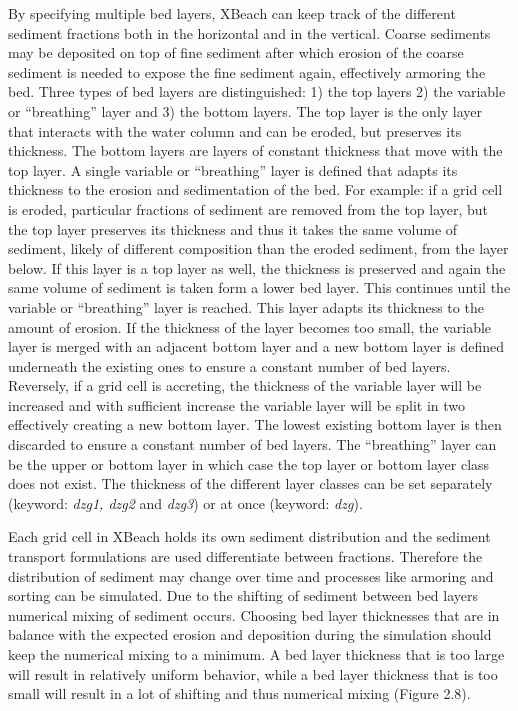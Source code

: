 \documentclass{article}
\begin{document}
\noindent By specifying multiple bed layers, XBeach can keep track of the different sediment fractions both in the horizontal and in the vertical. Coarse sediments may be deposited on top of fine sediment after which erosion of the coarse sediment is needed to expose the fine sediment again, effectively armoring the bed. Three types of bed layers are distinguished: 1) the top layers 2) the variable or ``breathing'' layer and 3) the bottom layers. The top layer is the only layer that interacts with the water column and can be eroded, but preserves its thickness. The bottom layers are layers of constant thickness that move with the top layer. A single variable or ``breathing'' layer is defined that adapts its thickness to the erosion and sedimentation of the bed. For example: if a grid cell is eroded, particular fractions of sediment are removed from the top layer, but the top layer preserves its thickness and thus it takes the same volume of sediment, likely of different composition than the eroded sediment, from the layer below. If this layer is a top layer as well, the thickness is preserved and again the same volume of sediment is taken form a lower bed layer. This continues until the variable or ``breathing'' layer is reached. This layer adapts its thickness to the amount of erosion. If the thickness of the layer becomes too small, the variable layer is merged with an adjacent bottom layer and a new bottom layer is defined underneath the existing ones to ensure a constant number of bed layers. Reversely, if a grid cell is accreting, the thickness of the variable layer will be increased and with sufficient increase the variable layer will be split in two effectively creating a new bottom layer. The lowest existing bottom layer is then discarded to ensure a constant number of bed layers. The ``breathing'' layer can be the upper or bottom layer in which case the top layer or bottom layer class does not exist. The thickness of the different layer classes can be set separately (keyword: \textit{dzg1, dzg2} and \textit{dzg3}) or at once (keyword: \textit{dzg}).

\noindent Each grid cell in XBeach holds its own sediment distribution and the sediment transport formulations are used differentiate between fractions. Therefore the distribution of sediment may change over time and processes like armoring and sorting can be simulated. Due to the shifting of sediment between bed layers numerical mixing of sediment occurs. Choosing bed layer thicknesses that are in balance with the expected erosion and deposition during the simulation should keep the numerical mixing to a minimum. A bed layer thickness that is too large will result in relatively uniform behavior, while a bed layer thickness that is too small will result in a lot of shifting and thus numerical mixing (Figure 2.8).
\end{document}
